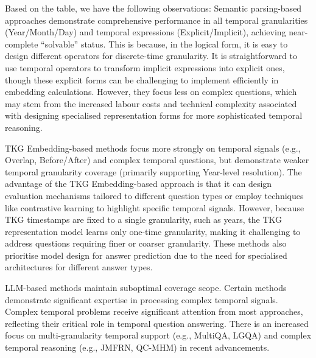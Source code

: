 Based on the table, we have the following observations:
Semantic parsing-based approaches demonstrate comprehensive performance in all temporal granularities (Year/Month/Day) and temporal expressions (Explicit/Implicit), achieving near-complete ``solvable'' status. This is because, in the logical form, it is easy to design different operators for discrete-time granularity. It is straightforward to use temporal operators to transform implicit expressions into explicit ones, though these explicit forms can be challenging to implement efficiently in embedding calculations.
However, they focus less on complex questions, which may stem from the increased labour costs and technical complexity associated with designing specialised representation forms for more sophisticated temporal reasoning.

TKG Embedding-based methods focus more strongly on temporal signals (e.g., Overlap, Before/After) and complex temporal questions, but demonstrate weaker temporal granularity coverage (primarily supporting Year-level resolution). The advantage of the TKG Embedding-based approach is that it can design evaluation mechanisms tailored to different question types or employ techniques like contrastive learning to highlight specific temporal signals. However, because TKG timestamps are fixed to a single granularity, such as years, the TKG representation model learns only one-time granularity, making it challenging to address questions requiring finer or coarser granularity. These methods also prioritise model design for answer prediction due to the need for specialised architectures for different answer types.

LLM-based methods maintain suboptimal coverage scope. Certain methods demonstrate significant expertise in processing complex temporal signals.
Complex temporal problems receive significant attention from most approaches, reflecting their critical role in temporal question answering.
There is an increased focus on multi-granularity temporal support (e.g., MultiQA, LGQA) and complex temporal reasoning (e.g., JMFRN, QC-MHM) in recent advancements.



